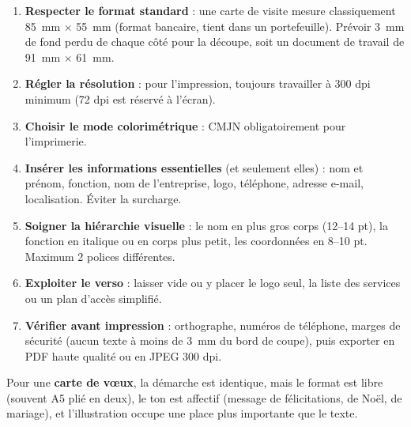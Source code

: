 \documentclass[11pt]{article}
\newcommand{\cle}[1]{{\popxbold\color{popdark}#1}}
\begin{document}
\begin{methode}
\begin{enumerate}
\item \textbf{Respecter le format standard} : une carte de visite mesure classiquement \SI{85}{mm} $\times$ \SI{55}{mm} (format bancaire, tient dans un portefeuille). Prévoir \SI{3}{mm} de \cle{fond perdu} de chaque côté pour la découpe, soit un document de travail de \SI{91}{mm} $\times$ \SI{61}{mm}.
\item \textbf{Régler la résolution} : pour l'impression, toujours travailler à \cle{300 dpi} minimum (72 dpi est réservé à l'écran).
\item \textbf{Choisir le mode colorimétrique} : CMJN obligatoirement pour l'imprimerie.
\item \textbf{Insérer les informations essentielles} (et seulement elles) : nom et prénom, fonction, nom de l'entreprise, logo, téléphone, adresse e-mail, localisation. Éviter la surcharge.
\item \textbf{Soigner la hiérarchie visuelle} : le nom en plus gros corps (12--14 pt), la fonction en italique ou en corps plus petit, les coordonnées en 8--10 pt. Maximum 2 polices différentes.
\item \textbf{Exploiter le verso} : laisser vide ou y placer le logo seul, la liste des services ou un plan d'accès simplifié.
\item \textbf{Vérifier avant impression} : orthographe, numéros de téléphone, marges de sécurité (aucun texte à moins de \SI{3}{mm} du bord de coupe), puis exporter en PDF haute qualité ou en JPEG 300 dpi.
\end{enumerate}
Pour une \textbf{carte de vœux}, la démarche est identique, mais le format est libre (souvent A5 plié en deux), le ton est affectif (message de félicitations, de Noël, de mariage), et l'illustration occupe une place plus importante que le texte.
\end{methode}
\end{document}
